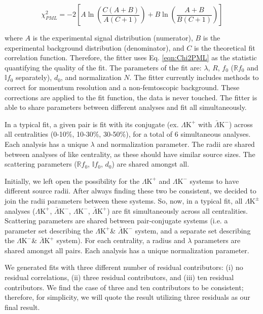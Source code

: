 \documentclass[ALICE,manyauthors]{cernphprep}
\newcommand{\LamKchP}{$\Lambda\mathrm{K^{+}}$\xspace}
\newcommand{\ALamKchM}{$\bar{\Lambda}\mathrm{K^{-}}$\xspace}
\newcommand{\LamKchM}{$\Lambda\mathrm{K^{-}}$\xspace}
\newcommand{\ALamKchP}{$\bar{\Lambda}\mathrm{K^{+}}$\xspace}
\newcommand{\LamKpm}{$\Lambda\mathrm{K^{\pm}}$\xspace}
\begin{document}
\begin{equation}
 \chi^{2}_{PML} = -2\left[A\ln\left(\frac{C(A+B)}{A(C+1)}\right) + B\ln\left(\frac{A+B}{B(C+1)}\right)\right]
\label{eqn:Chi2PML}
\end{equation}

where $A$ is the experimental signal distribution (numerator), $B$ is the experimental background distribution (denominator), and $C$ is the theoretical fit correlation function.
Therefore, the fitter uses Eq. \ref{eqn:Chi2PML} as the statistic quantifying the quality of the fit.
The parameters of the fit are: $\lambda$, $R$, $f_{0}$ ($\mathbb{R}f_{0}$ and $\mathbb{I}f_{0}$ separately), $d_{0}$, and normalization $N$.
The fitter currently includes methods to correct for momentum resolution and a non-femtoscopic background.
These corrections are applied to the fit function, the data is never touched.
The fitter is able to share parameters between different analyses and fit all simultaneously.  

In a typical fit, a given pair is fit with its conjugate (ex. \LamKchP with \ALamKchM) across all centralities (0-10\%, 10-30\%, 30-50\%), for a total of 6 simultaneous analyses.
Each analysis has a unique $\lambda$ and normalization parameter.
The radii are shared between analyses of like centrality, as these should have similar source sizes.
The scattering parameters ($\mathbb{R}f_{0}$, $\mathbb{I}f_{0}$, $d_{0}$) are shared amongst all.

Initially, we left open the possibility for the \LamKchP and \LamKchM systems to have different source radii.  
After always finding these two be consistent, we decided to join the radii parameters between these systems.  
So, now, in a typical fit, all \LamKpm analyses (\LamKchP, \ALamKchM, \LamKchM, \ALamKchP) are fit simultaneously across all centralities.  
Scattering parameters are shared between pair-conjugate systems (i.e. a parameter set describing the \LamKchP \& \ALamKchM system, and a separate set describing the \LamKchM \& \ALamKchP system).  
For each centrality, a radius and $\lambda$ parameters are shared amongst all pairs.  
Each analysis has a unique normalization parameter.

We generated fits with three different number of residual contributors:  (i) no residual correlations, (ii) three residual contributors, and (iii) ten residual contributors.  
We find the case of three and ten contributors to be consistent; therefore, for simplicity, we will quote the result utilizing three residuals as our final result.
\end{document}
